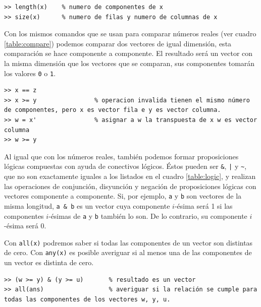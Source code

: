 \documentclass[letter,11pt]{article}
\newcommand\0{\mathbf{0}}
\begin{document}
    \medskip

\begin{lstlisting}
>> length(x)    % numero de componentes de x
>> size(x)      % numero de filas y numero de columnas de x
\end{lstlisting}

	\medskip
				
	Con los mismos comandos que se usan para comparar n\'umeros reales
	(ver cuadro \ref{table:compare})
	podemos comparar dos vectores
	de igual dimensi\'on, esta comparaci\'on se hace componente a componente.
	El resultado ser\'a un vector con la misma dimensi\'on que los vectores
	que se comparan, sus componentes tomar\'an los valores \Verb+0+ o \Verb+1+.
	
	\medskip

\begin{lstlisting}[gobble=2,frame=single]			
>> x == z
>> x >= y                % operacion invalida tienen el mismo número de componentes, pero x es vector fila e y es vector columna.
>> w = x'                % asignar a w la transpuesta de x w es vector columna
>> w >= y
\end{lstlisting}

\medskip
	
	Al igual que con los n\'umeros reales, tambi\'en podemos formar
	proposiciones l\'ogicas compuestas con ayuda de conectivos l\'ogicos.
	\'Estos pueden ser \Verb+&+, \Verb+|+ y \Verb+~+, que no son exactamente
	iguales a los listados en el cuadro \ref{table:logic}, y
	realizan las operaciones de conjunci\'on, disyunci\'on y negaci\'on de proposiciones
	l\'ogicas con vectores componente a componente.
	Si, por ejemplo, \Verb+a+ y \Verb+b+ son vectores de la misma longitud, \Verb+a & b+
	es un vector cuya componente $i$-\'esima ser\'a 1 si las componentes $i$-\'esimas
	de \Verb+a+ y \Verb+b+ tambi\'en lo son. De lo contrario, su componente $i$-\'esima
	ser\'a 0.

	Con \Verb+all(x)+ podremos saber si todas las componentes de
	un vector son distintas de cero.
	Con \Verb+any(x)+ es posible averiguar si al menos una de las componentes de un vector
	es distinta de cero.
	
	\medskip

\begin{lstlisting}		
>> (w >= y) & (y >= u)       % resultado es un vector
>> all(ans)                  % averiguar si la relación se cumple para todas las componentes de los vectores w, y, u.
\end{lstlisting}
\end{document}
